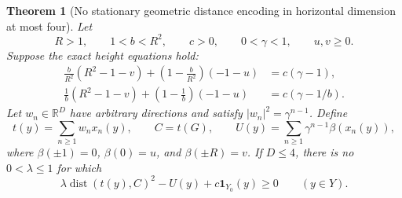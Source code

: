 \documentclass[11pt,letterpaper]{amsart}
\newtheorem{theorem}{Theorem}[section]
\theoremstyle{definition}
\theoremstyle{remark}
\numberwithin{equation}{section}
\DeclareMathOperator{\dist}{dist}
\begin{document}
\begin{theorem}[No stationary geometric distance encoding in
horizontal dimension at most four]\label{enc:universal}
Let
\[
 R>1,\qquad 1<b<R^2,\qquad c>0,\qquad 0<\gamma<1,
 \qquad u,v\ge0.
\]
Suppose the exact height equations hold:
\begin{equation}\label{enc:eq:telescoping}
\begin{aligned}
 \frac b{R^2}(R^2-1-v)
  +\left(1-\frac b{R^2}\right)(-1-u)&=c(\gamma-1),\\
 \frac1b(R^2-1-v)
  +\left(1-\frac1b\right)(-1-u)&=c(\gamma-1/b).
\end{aligned}
\end{equation}
Let $w_n\in\mathbb R^D$ have arbitrary directions and satisfy
$|w_n|^2=\gamma^{n-1}$. Define
\[
 t(y)=\sum_{n\ge1}w_nx_n(y),\qquad C=t(G),\qquad
 U(y)=\sum_{n\ge1}\gamma^{n-1}\beta(x_n(y)),
\]
where $\beta(\pm1)=0$, $\beta(0)=u$, and $\beta(\pm R)=v$.
If $D\le4$, there is no $0<\lambda\le1$ for which
\begin{equation}\label{enc:eq:containment}
 \lambda\dist(t(y),C)^2-U(y)+c\mathbf1_{Y_0}(y)\ge0
 \qquad(y\in Y).
\end{equation}
\end{theorem}
\end{document}
